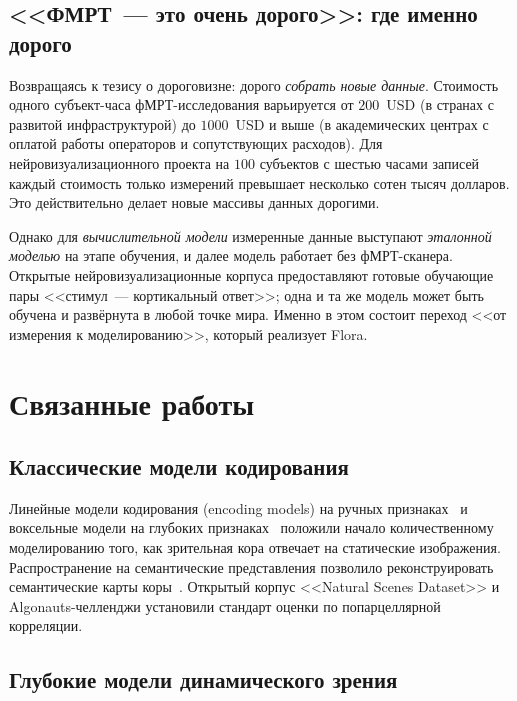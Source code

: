 \documentclass[11pt,a4paper]{article}
\begin{document}
\subsection{<<ФМРТ~--- это очень дорого>>: где именно дорого}
\label{sec:neuro-cost}

Возвращаясь к тезису о дороговизне: дорого \emph{собрать новые данные}.
Стоимость одного субъект-часа фМРТ-исследования варьируется от
$200$~USD (в странах с развитой инфраструктурой) до $1000$~USD и
выше (в академических центрах с оплатой работы операторов и
сопутствующих расходов). Для нейровизуализационного проекта на
$100$ субъектов с шестью часами записей каждый стоимость только
измерений превышает несколько сотен тысяч долларов. Это действительно
делает новые массивы данных дорогими.

Однако для \emph{вычислительной модели} измеренные данные выступают
\emph{эталонной моделью} на этапе обучения, и далее модель работает без
фМРТ-сканера. Открытые нейровизуализационные корпуса
предоставляют готовые обучающие пары <<стимул~--- кортикальный
ответ>>; одна и та же модель может быть обучена и развёрнута в
любой точке мира. Именно в этом состоит переход <<от измерения к
моделированию>>, который реализует Flora.

\section{Связанные работы}
\label{sec:related}

\subsection{Классические модели кодирования}
\label{sec:related-encoding}

Линейные модели кодирования (encoding models) на ручных
признаках~\cite{Kay2008} и воксельные модели на глубоких
признаках~\cite{Naselaris2011} положили начало количественному
моделированию того, как зрительная кора отвечает на статические
изображения. Распространение на семантические представления
позволило реконструировать семантические карты
коры~\cite{Mitchell2008,Huth2016,LeBel2023}. Открытый корпус
<<Natural Scenes Dataset>> и Algonauts-челленджи установили стандарт
оценки по попарцеллярной корреляции.

\subsection{Глубокие модели динамического зрения}
\label{sec:related-dynamic}
\end{document}
